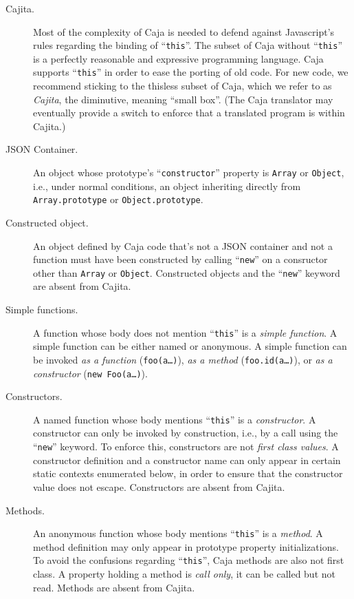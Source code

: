 \documentclass[letterpaper,twocolumn,10pt]{article}
\newcommand{\code}[1]{{\tt {#1}}}              %
\begin{document}
\begin{description}

  \item[Cajita.] Most of the complexity of Caja is needed to defend 
  against Javascript's rules regarding the binding of ``\code{this}''. The 
  subset of Caja without ``\code{this}'' is a perfectly reasonable and 
  expressive programming language. Caja supports ``\code{this}'' in order to 
  ease the porting of old code. For new code, we recommend sticking to the
  thisless subset of Caja, which we refer to as \emph{Cajita}, the diminutive,
  meaning ``small box''. (The Caja translator may eventually provide
  a switch to enforce that a translated program is within Cajita.)

  \item[JSON Container.] An object whose prototype's ``\code{constructor}'' 
  property is \code{Array} or \code{Object}, i.e., under normal conditions, 
  an object inheriting directly from \code{Array.prototype} or 
  \code{Object.prototype}.

  \item[Constructed object.] An object defined by Caja code that's not a 
  JSON container and not a function must have been constructed by calling 
  ``\code{new}'' on a consructor other than \code{Array} or \code{Object}. 
  Constructed objects and the ``\code{new}'' keyword are absent from Cajita.

  \item[Simple functions.] A function whose body does not mention 
  ``\code{this}'' is a \emph{simple function}. A simple function can be 
  either named or anonymous. A simple function can be invoked \emph{as a 
  function} (\code{foo(a\ldots)}), \emph{as a method} 
  (\code{foo.id(a\ldots)}), or \emph{as a constructor} (\code{new 
  Foo(a\ldots)}).
    
  \item[Constructors.] A named function whose body mentions ``\code{this}'' 
  is a \emph{constructor}. A constructor can only be invoked by construction, 
  i.e., by a call using the ``\code{new}'' keyword. To enforce this, 
  constructors are not \emph{first class values}. A constructor definition 
  and a constructor name can only appear in certain static contexts 
  enumerated below, in order to ensure that the constructor value does not 
  escape. Constructors are absent from Cajita.
    
  \item[Methods.] An anonymous function whose body mentions ``\code{this}'' 
  is a \emph{method}. A method definition may only appear in prototype 
  property initializations. To avoid the confusions regarding 
  ``\code{this}'', Caja methods are also not first class. A property holding 
  a method is \emph{call only}, it can be called but not read. Methods are 
  absent from Cajita.
  

\end{description}
\end{document}
